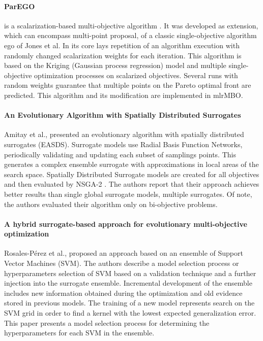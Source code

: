        \paragraph{ParEGO}\label{alg:ParEGO} is a scalarization-based multi-objective algorithm \cite{Knowles06}. It was developed as extension, which can encompass multi-point proposal, of a classic single-objective algorithm \gls{ego} \cite{JonesSW98} of Jones et al. In its core lays repetition of an algorithm execution with randomly changed scalarization weights for each iteration.  This algorithm is based on the Kriging (Gaussian process regression) model and multiple single-objective optimization processes on scalarized objectives. Several runs with random weights guarantee that multiple points on the Pareto optimal front are predicted. This algorithm and its modification are implemented in mlrMBO\cite{BischlmlrMBO}.


        \paragraph{An Evolutionary Algorithm with Spatially Distributed Surrogates} Amitay et al.,\cite{DistrSurr} presented an evolutionary algorithm with spatially distributed surrogates (EASDS). Surrogate models use Radial Basis Function Networks, periodically validating and updating each subset of samplings points. This generates a complex ensemble surrogate with approximations in local areas of the search space. Spatially Distributed Surrogate models are created for all objectives and then evaluated by NSGA-2 \cite{DistrSurr}. The authors report that their approach achieves better results than single global surrogate models, multiple surrogates. Of note, the authors evaluated their algorithm only on bi-objective problems.

        \paragraph{A hybrid surrogate-based approach for evolutionary multi-objective optimization} Rosales-Pérez et al.,\cite{HybridSurrRCG} proposed an approach based on an ensemble of Support Vector Machines (SVM). The authors describe a model selection process or hyperparameters selection of SVM based on a validation technique and a further injection into the surrogate ensemble. Incremental development of the ensemble includes new information obtained during the optimization and old evidence stored in previous models. 
        The training of a new model represents search on the SVM grid in order to find a kernel with the lowest expected generalization error. This paper presents a model selection process for determining the hyperparameters for each SVM in the ensemble.


